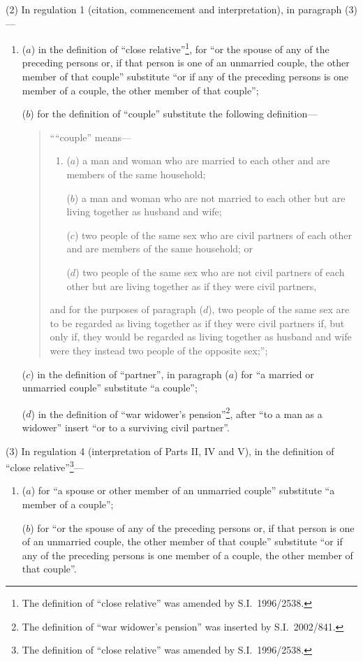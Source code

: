 \documentclass[12pt,a4paper]{article}
\begin{document}
(2) In regulation 1 (citation, commencement and interpretation), in paragraph (3)—
\begin{enumerate}\item[]
($a$) in the definition of “close relative”\footnote{The definition of “close relative” was amended by S.I.\ 1996/2538.}, for “or the spouse of any of the preceding persons or, if that person is one of an unmarried couple, the other member of that couple” substitute “or if any of the preceding persons is one member of a couple, the other member of that couple”;

($b$) for the definition of “couple” substitute the following definition—
\begin{quotation}
““couple” means—
\begin{enumerate}\item[]
($a$) 
a man and woman who are married to each other and are members of the same household;

($b$) 
a man and woman who are not married to each other but are living together as husband and wife;

($c$) 
two people of the same sex who are civil partners of each other and are members of the same household; or

($d$) 
two people of the same sex who are not civil partners of each other but are living together as if they were civil partners,
\end{enumerate}
and for the purposes of paragraph ($d$), two people of the same sex are to be regarded as living together as if they were civil partners if, but only if, they would be regarded as living together as husband and wife were they instead two people of the opposite sex;”;
\end{quotation}

($c$) in the definition of “partner”, in paragraph ($a$)  for “a married or unmarried couple” substitute “a couple”;

($d$) in the definition of “war widower’s pension”\footnote{The definition of “war widower’s pension” was inserted by S.I.\ 2002/841.}, after “to a man as a widower” insert “or to a surviving civil partner”.
\end{enumerate}

(3) In regulation 4 (interpretation of Parts II, IV and V), in the definition of “close relative”\footnote{The definition of “close relative” was amended by S.I.\ 1996/2538.}—
\begin{enumerate}\item[]
($a$) for “a spouse or other member of an unmarried couple” substitute “a member of a couple”;

($b$) for “or the spouse of any of the preceding persons or, if that person is one of an unmarried couple, the other member of that couple” substitute “or if any of the preceding persons is one member of a couple, the other member of that couple”.
\end{enumerate}
\end{document}
